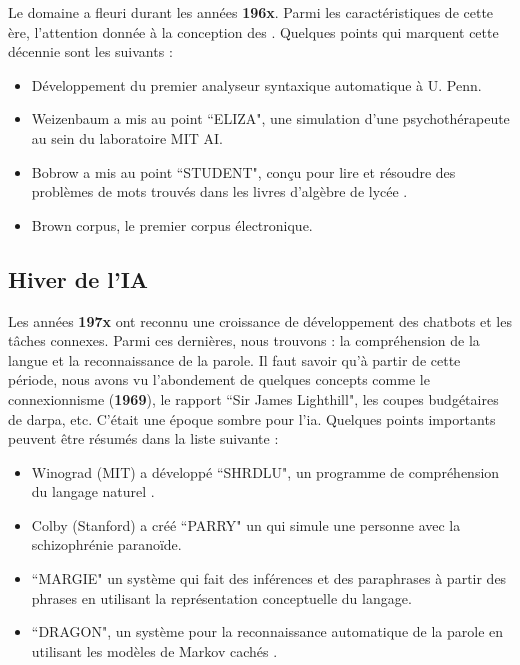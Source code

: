 \documentclass{KodeBook}
\begin{document}
Le domaine a fleuri durant les années \textbf{196x}.
Parmi les caractéristiques de cette ère, l'attention donnée à la conception des . 
Quelques points qui marquent cette décennie sont les suivants :
\begin{itemize}
	\item {} Développement du premier analyseur syntaxique automatique à U. Penn. \cite{1961-joshi,1962-harris} 
	\item {} Weizenbaum a mis au point ``ELIZA", une simulation d'une psychothérapeute au sein du laboratoire MIT AI.
	\item {} Bobrow a mis au point ``STUDENT", conçu pour lire et résoudre des problèmes de mots trouvés dans les livres d'algèbre de lycée \cite{1964-bobrow}.
	\item {} Brown corpus, le premier corpus électronique.
\end{itemize}

\subsection{Hiver de l'IA}

Les années \textbf{197x} ont reconnu une croissance de développement des chatbots et les tâches connexes. 
Parmi ces dernières, nous trouvons : la compréhension de la langue et la reconnaissance  de la parole. 
Il faut savoir qu'à partir de cette période, nous avons vu l'abondement de quelques concepts comme le connexionnisme (\textbf{1969}), le rapport ``Sir James Lighthill", les coupes budgétaires de \ac{darpa}, etc. 
C'était une époque sombre pour l'\ac{ia}.
Quelques points importants peuvent être résumés dans la liste suivante :
\begin{itemize}
	\item {} Winograd (MIT) a développé ``SHRDLU", un programme de compréhension du langage naturel \cite{1971-winograd}.
	\item {} Colby (Stanford) a créé ``PARRY" un  qui simule une personne avec la schizophrénie paranoïde.
	\item {} ``MARGIE" un système qui fait des inférences et des paraphrases à partir des phrases en utilisant la représentation conceptuelle du langage. 
	\item {} ``DRAGON", un système pour la reconnaissance automatique de la parole en utilisant les modèles de Markov cachés \cite{1975-baker}.
\end{itemize}
\end{document}
